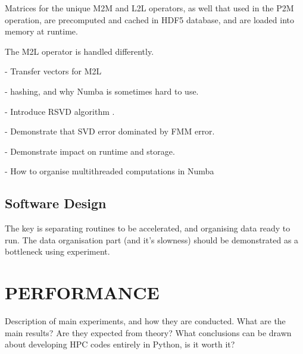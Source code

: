 \documentclass{IEEEcsmag}
\begin{document}
Matrices for the unique M2M and L2L operators, as well that used in the P2M operation, are precomputed and cached in HDF5 database, and are loaded into memory at runtime.

The M2L operator is handled differently.

- Transfer vectors for M2L

- hashing, and why Numba is sometimes hard to use.

- Introduce RSVD algorithm \cite{Halko2011}.

- Demonstrate that SVD error dominated by FMM error.

- Demonstrate impact on runtime and storage.

- How to organise multithreaded computations in Numba

\subsection{Software Design}

The key is separating routines to be accelerated, and organising data ready to run. The data organisation part (and it's slowness) should be demonstrated as a bottleneck using experiment.

\section{PERFORMANCE}

Description of main experiments, and how they are conducted. What are the main results? Are they expected from theory? What conclusions can be drawn about developing HPC codes entirely in Python, is it worth it?





\end{document}
